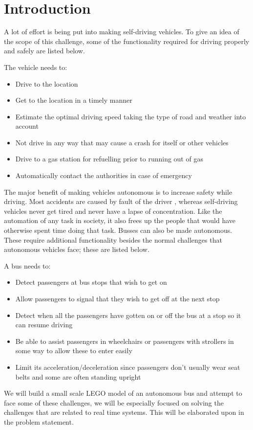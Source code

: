 \chapter{Introduction}

A lot of effort is being put into making self-driving vehicles. To give an idea of the scope of this challenge, some of the functionality required for driving properly and safely are listed below.

The vehicle needs to:
\begin{itemize}
\item Drive to the location
\item Get to the location in a timely manner
\item Estimate the optimal driving speed taking the type of road and weather into account
\item Not drive in any way that may cause a crash for itself or other vehicles
\item Drive to a gas station for refuelling prior to running out of gas
\item Automatically contact the authorities in case of emergency
\end{itemize}

The major benefit of making vehicles autonomous is to increase safety while driving. Most accidents are caused by fault of the driver \cite{baddriver}, whereas self-driving vehicles never get tired and never have a lapse of concentration. Like the automation of any task in society, it also frees up the people that would have otherwise spent time doing that task. Busses can also be made autonomous. These require additional functionality besides the normal challenges that autonomous vehicles face; these are listed below.

A bus needs to:
\begin{itemize}
\item Detect passengers at bus stops that wish to get on
\item Allow passengers to signal that they wish to get off at the next stop
\item Detect when all the passengers have gotten on or off the bus at a stop so it can resume driving
\item Be able to assist passengers in wheelchairs or passengers with strollers in some way to allow these to enter easily
\item Limit its acceleration/deceleration since passengers don't usually wear seat belts and some are often standing upright
\end{itemize}

We will build a small scale LEGO model of an autonomous bus and attempt to face some of these challenges, we will be especially focused on solving the challenges that are related to real time systems. This will be elaborated upon in the problem statement. 

